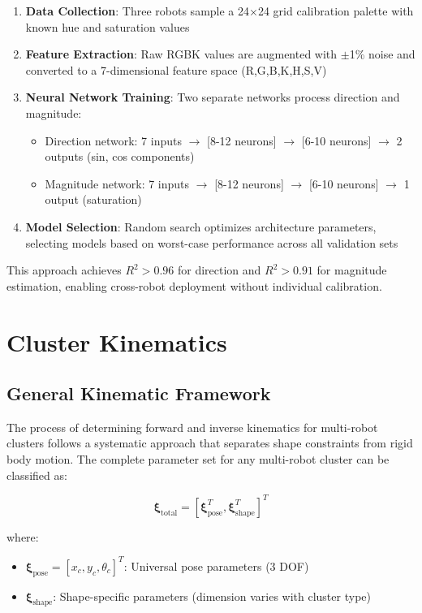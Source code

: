 \documentclass{article}
\begin{document}
\begin{enumerate}
\item \textbf{Data Collection}: Three robots sample a 24$\times$24 grid calibration palette with known hue and saturation values
\item \textbf{Feature Extraction}: Raw RGBK values are augmented with $\pm$1\% noise and converted to a 7-dimensional feature space (R,G,B,K,H,S,V)
\item \textbf{Neural Network Training}: Two separate networks process direction and magnitude:
   \begin{itemize}
   \item Direction network: 7 inputs $\rightarrow$ [8-12 neurons] $\rightarrow$ [6-10 neurons] $\rightarrow$ 2 outputs (sin, cos components)
   \item Magnitude network: 7 inputs $\rightarrow$ [8-12 neurons] $\rightarrow$ [6-10 neurons] $\rightarrow$ 1 output (saturation)
   \end{itemize}
\item \textbf{Model Selection}: Random search optimizes architecture parameters, selecting models based on worst-case performance across all validation sets
\end{enumerate}

This approach achieves $R^2 > 0.96$ for direction and $R^2 > 0.91$ for magnitude estimation, enabling cross-robot deployment without individual calibration.

\section{Cluster Kinematics}

\subsection{General Kinematic Framework}

The process of determining forward and inverse kinematics for multi-robot clusters follows a systematic approach that separates shape constraints from rigid body motion. The complete parameter set for any multi-robot cluster can be classified as:

\begin{equation}
\boldsymbol{\xi}_{\text{total}} = [\boldsymbol{\xi}_{\text{pose}}^T, \boldsymbol{\xi}_{\text{shape}}^T]^T
\end{equation}

where:
\begin{itemize}
\item $\boldsymbol{\xi}_{\text{pose}} = [x_c, y_c, \theta_c]^T$: Universal pose parameters (3 DOF)
\item $\boldsymbol{\xi}_{\text{shape}}$: Shape-specific parameters (dimension varies with cluster type)
\end{itemize}
\end{document}
